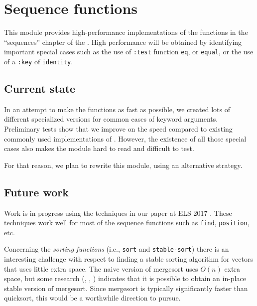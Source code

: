 \chapter{Sequence functions}

This module provides high-performance implementations of the
functions in the ``sequences'' chapter of the \hs{}.  High
performance will be obtained by identifying important special cases
such as the use of \texttt{:test} function \texttt{eq}, or
\texttt{equal}, or the use of a \texttt{:key} of \texttt{identity}. 

\section{Current state}

In an attempt to make the functions as fast as possible, we created
lots of different specialized versions for common cases of keyword
arguments.  Preliminary tests show that we improve on the speed
compared to existing commonly used implementations of \commonlisp{}.
However, the existence of all those special cases also makes the
module hard to read and difficult to test.

For that reason, we plan to rewrite this module, using an alternative
strategy.

\section{Future work}
\label{sec-sequence-functions-future-work}

Work is in progress using the techniques in our paper at ELS 2017
\cite{Durand:2017:ELS:Sequence}.  These techniques work well for most
of the sequence functions such as \texttt{find}, \texttt{position},
etc.

Concerning the \emph{sorting functions} (i.e., \texttt{sort} and
\texttt{stable-sort}) there is an interesting challenge with respect
to finding a stable sorting algorithm for vectors that uses little
extra space.  The naive version of mergesort uses $O(n)$ extra space,
but some research (\cite{Huang:1990:FSM:898863},
\cite{Huang:1988:PIM:42392.42403},
\cite{Katajainen:1996:PIM:642136.642138}) indicates that it is
possible to obtain an in-place stable version of mergesort.  Since
mergesort is typically significantly faster than quicksort, this would
be a worthwhile direction to pursue.
